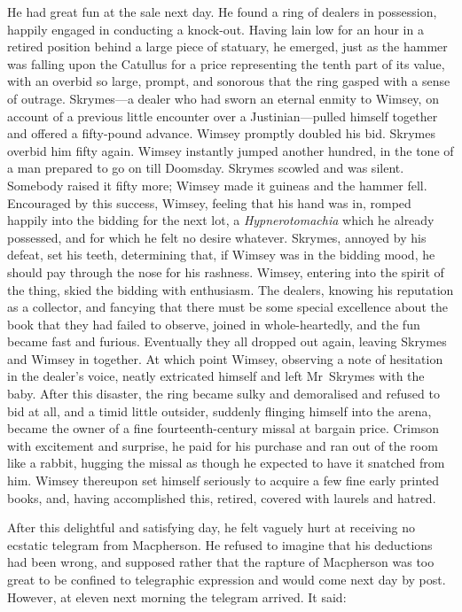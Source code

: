 He had great fun at the sale next day. He found a ring of dealers in possession, happily engaged in conducting a knock-out. Having lain low for an hour in a retired position behind a large piece of statuary, he emerged, just as the hammer was falling upon the Catullus for a price representing the tenth part of its value, with an overbid so large, prompt, and sonorous that the ring gasped with a sense of outrage. Skrymes—a dealer who had sworn an eternal enmity to Wimsey, on account of a previous little encounter over a Justinian—pulled himself together and offered a fifty-pound advance. Wimsey promptly doubled his bid. Skrymes overbid him fifty again. Wimsey instantly jumped another hundred, in the tone of a man prepared to go on till Doomsday. Skrymes scowled and was silent. Somebody raised it fifty more; Wimsey made it guineas and the hammer fell. Encouraged by this success, Wimsey, feeling that his hand was in, romped happily into the bidding for the next lot, a \textit{Hypnerotomachia} which he already possessed, and for which he felt no desire whatever. Skrymes, annoyed by his defeat, set his teeth, determining that, if Wimsey was in the bidding mood, he should pay through the nose for his rashness. Wimsey, entering into the spirit of the thing, skied the bidding with enthusiasm. The dealers, knowing his reputation as a collector, and fancying that there must be some special excellence about the book that they had failed to observe, joined in whole-heartedly, and the fun became fast and furious. Eventually they all dropped out again, leaving Skrymes and Wimsey in together. At which point Wimsey, observing a note of hesitation in the dealer's voice, neatly extricated himself and left Mr~Skrymes with the baby. After this disaster, the ring became sulky and demoralised and refused to bid at all, and a timid little outsider, suddenly flinging himself into the arena, became the owner of a fine fourteenth-century missal at bargain price. Crimson with excitement and surprise, he paid for his purchase and ran out of the room like a rabbit, hugging the missal as though he expected to have it snatched from him. Wimsey thereupon set himself seriously to acquire a few fine early printed books, and, having accomplished this, retired, covered with laurels and hatred.

After this delightful and satisfying day, he felt vaguely hurt at receiving no ecstatic telegram from Macpherson. He refused to imagine that his deductions had been wrong, and supposed rather that the rapture of Macpherson was too great to be confined to telegraphic expression and would come next day by post. However, at eleven next morning the telegram arrived. It said:


